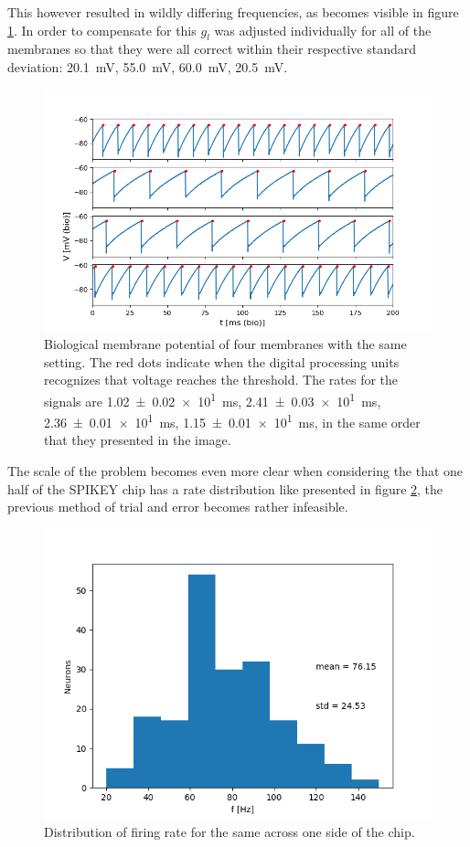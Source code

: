 \documentclass[a4paper,twocolumn]{article}
\begin{document}
This however resulted in wildly differing frequencies, as becomes visible in
figure \ref{fig:4membranes}. In order to compensate for this $g_l$ was adjusted
individually for all of the membranes so that they were all correct within their
respective standard deviation: \SI{20.1}{\milli\volt}, \SI{55.0}{\milli\volt},
\SI{60.0}{\milli\volt}, \SI{20.5}{\milli\volt}.

\begin{figure}[ht]
    \centering
    \includegraphics[width=.5\textwidth]{figures/4membranes.png}
    \caption{Biological membrane potential of four membranes with the same
    setting. The red dots indicate when the digital processing units recognizes
    that voltage reaches the threshold. The rates for the signals are
    \SI{1.02(2)e1}{\milli\second}, \SI{2.41(3)e1}{\milli\second},
    \SI{2.36(1)e1}{\milli\second}, \SI{1.15(1)e1}{\milli\second}, in the same
    order that they presented in the image. }
    \label{fig:4membranes}
\end{figure}

The scale of the problem becomes even more clear when considering the that one
half of the SPIKEY chip has a rate distribution like presented in figure
\ref{fig:distribution}, the previous method of trial and error becomes rather
infeasible.

\begin{figure}[ht]
    \centering
    \includegraphics[width=.5\textwidth]{figures/rate-distribution.png}
    \caption{Distribution of firing rate for the same across one side of the
    chip.}
    \label{fig:distribution}
\end{figure}
\end{document}
